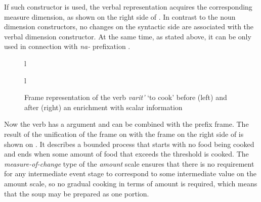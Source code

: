 If such constructor is used, the verbal representation acquires the corresponding measure dimension, as shown on the right side of . In contrast to the noun dimension constructors, no changes on the syntactic side are associated with the verbal dimension constructor. At the same time, as stated above, it can be only used in connection with \textit{na-}  prefixation . 

\begin{figure}
\begin{tabular}[t]{l}
\end{tabular}
\hfill
\begin{tabular}[t]{l}
\end{tabular}
\caption{Frame representation of the verb \textit{varit'} `to cook' before (left) and after (right) an enrichment with scalar information \label{frame:varit}}
\end{figure}

Now the verb has a {\scshape\VERBDIM} argument and can be combined with the prefix frame. The result of the unification of the frame on  with the frame on the right side of  is shown on . It describes a bounded process that starts with no food being cooked and ends when some amount of food that exceeds the threshold is cooked. The \textit{measure-of-change} type of the \textit{amount} scale ensures that there is no requirement for any intermediate event stage to correspond to some intermediate value on the amount scale, so no gradual cooking in terms of amount is required, which means that the soup may be prepared as one portion.

